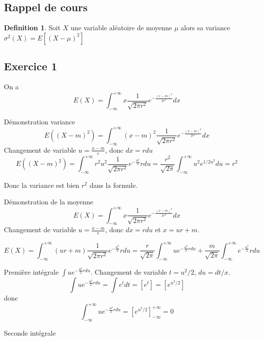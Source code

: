 \documentclass[]{book}
\theoremstyle{definition}
\newtheorem{defn}{Definition}
\begin{document}
\subsection*{Rappel de cours}
\begin{defn}
Soit $X$ une variable al\'eatoire de moyenne $\mu$ alors sa variance $\sigma^2(X) = E[(X-\mu)^2]$
\end{defn}



\newpage
\subsection*{Exercice 1}
On a 
$$
E(X) = \int_{-\infty}^{+\infty}{x \frac{1}{\sqrt{2\pi r^2}} e^{-\frac{(x-m)^2}{2r^2}} dx}
$$

D\'emonstration variance
$$
E((X-m)^2) = \int_{-\infty}^{+\infty}{(x-m)^2\frac{1}{\sqrt{2\pi r^2}} e^{-\frac{(x-m)^2}{2r^2}} dx}
$$
Changement de variable $u = \frac{x-m}{r}$, donc $dx = rdu$
$$
E((X-m)^2) = \int_{-\infty}^{+\infty}{r^2u^2\frac{1}{\sqrt{2\pi r^2}} e^{-\frac{u^2}{2}} r du} =
\frac{r^2}{\sqrt{2\pi}}\int_{-\infty}^{+\infty}{u^2 e^{1/2u^2}du} = r^2
$$

Donc la variance est bien $r^2$ dans la formule.

D\'emonstration de la moyenne
$$
E(X) = \int_{-\infty}^{+\infty}{x \frac{1}{\sqrt{2\pi r^2}} e^{-\frac{(x-m)^2}{2r^2}} dx}
$$
Changement de variable $u = \frac{x-m}{r}$, donc $dx = rdu$ et $x=ur+m$.

$$
E(X) = \int_{-\infty}^{+\infty}{(ur+m) \frac{1}{\sqrt{2\pi r^2}} e^{-\frac{u^2}{2}} rdu} = 
\frac{r}{\sqrt{2\pi}} \int_{-\infty}^{+\infty}{u e^{-\frac{u^2}{2} rdu}}  + \frac{m}{\sqrt{2\pi}} \int_{-\infty}^{+\infty}{e^{-\frac{u^2}{2}} r du}
$$

Premi\`ere int\'egrale $\int{u e^{-\frac{u^2}{2} rdu}}$. Changement de variable $t = u^2/2$, $du = dt/x$.
$$
\int{u e^{-\frac{u^2}{2} rdu}} = \int{e^t dt} = [e^t] = [e^{u^2/2}]
$$
donc
$$
\int_{-\infty}^{+\infty}{u e^{-\frac{u^2}{2} rdu}} = [e^{u^2/2}]_{-\infty}^{+\infty} = 0
$$

Seconde int\'egrale
\end{document}
